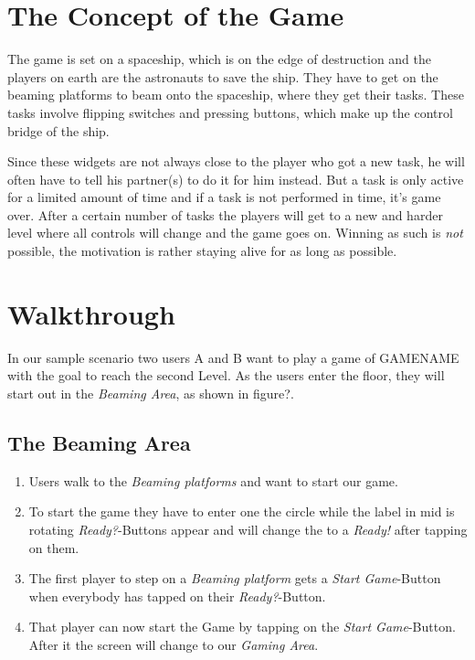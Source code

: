 \documentclass{sigchi}
\begin{document}
\section{The Concept of the Game}
\vspace{1mm}
The game is set on a spaceship, which is on the edge of destruction and the players on earth are the astronauts to save the ship. They have to get on the beaming platforms to beam onto the spaceship, where they get their tasks. These tasks involve flipping switches and pressing buttons, which make up the control bridge of the ship. 

Since these widgets are not always close to the player who got a new task, he will often have to tell his partner(s) to do it for him instead. But a task is only active for a limited amount of time and if a task is not performed in time, it's game over. \newline
After a certain number of tasks the players will get to a new and harder level where all controls will change and the game goes on. Winning as such is \textit{not} possible, the motivation is rather staying alive for as long as possible.

\section{Walkthrough}
\vspace{1mm}
In our sample scenario two users A and B want to play a game of GAMENAME with the goal to reach the second Level. As the users enter the floor, they will start out in the \textit{Beaming Area}, as shown in figure?.

\subsection{The Beaming Area}
\vspace{2mm}
\begin{enumerate}
\item Users walk to the \textit{Beaming platforms} and want to start our game.
\item To start the game they have to enter one the circle while the label in mid is rotating \textit{Ready?}-Buttons appear and will change the to a \textit{Ready!} after tapping on them.
\item The first player to step on a \textit{Beaming platform} gets a \textit{Start Game}-Button when everybody has tapped on their \textit{Ready?}-Button.
\item That player can now start the Game by tapping on the \textit{Start Game}-Button. After it the screen will change to our \textit{Gaming Area}.
\end{enumerate}
\end{document}
